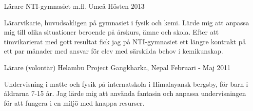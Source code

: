 \begin{cventries}

\cventry
{Lärare} %
{NTI-gymnasiet m.fl.} %
{Umeå} %
{Hösten 2013} %
{ %
\begin{cvitems}
\item {Lärarvikarie, huvudsakligen på gymnasiet i fysik och kemi. Lärde mig att anpassa mig till olika situationer beroende på årskurs, ämne och skola. 
			Efter att timvikarierat med gott resultat fick jag på NTI-gymnasiet ett längre kontrakt på ett par månader med ansvar för elev med särskilda behov i kemikunskap. }
\end{cvitems}
}

\cventry
{Lärare (volontär)} %
{Helambu Project} %
{Gangkharka, Nepal} %
{Februari - Maj 2011} %
{ %
\begin{cvitems}
\item {Undervisning i matte och fysik på internatskola i Himalayansk bergsby, för barn i åldrarna 7-15 år. 
			Jag lärde mig att använda fantasin och anpassa undervisningen för att fungera i en miljö med knappa resurser.}
\end{cvitems}
}

\end{cventries}